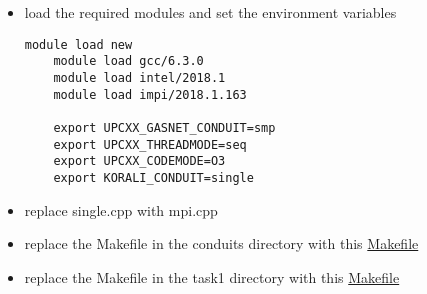 \documentclass[11pt]{article}
\begin{document}
    \begin{itemize}
        \item load the required modules and set the environment variables
        \begin{lstlisting}[basicstyle=\footnotesize]
    module load new
    module load gcc/6.3.0
    module load intel/2018.1
    module load impi/2018.1.163

    export UPCXX_GASNET_CONDUIT=smp
    export UPCXX_THREADMODE=seq
    export UPCXX_CODEMODE=O3
    export KORALI_CONDUIT=single
        \end{lstlisting}
        \item replace single.cpp with mpi.cpp
        \item replace the Makefile in the conduits directory
        with this
        \href{https://github.com/anianruoss/HPCSE-II/blob/master/exercise04/task1/conduits/Makefile_MPI}{Makefile}
        \item replace the Makefile in the task1 directory with this
        \href{https://github.com/anianruoss/HPCSE-II/blob/master/exercise04/task1/Makefile_MPI}{Makefile}
    \end{itemize}
\end{document}
